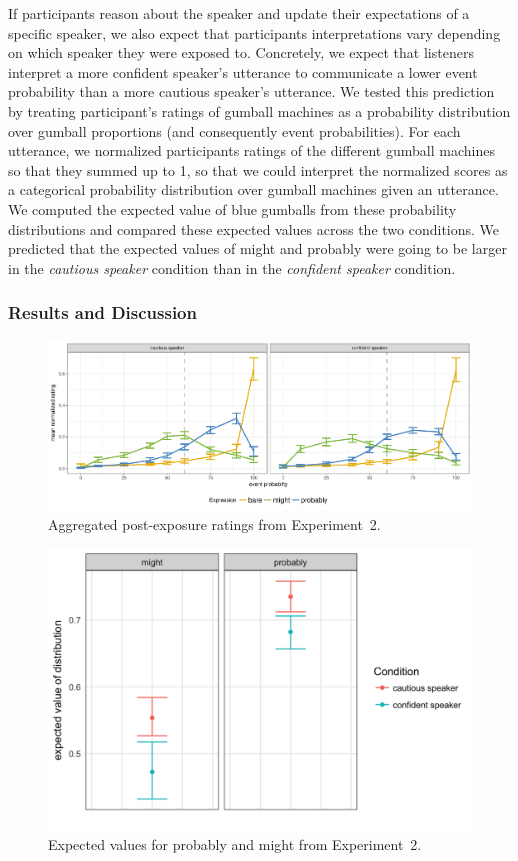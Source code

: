 \documentclass[lucida,biblatex]{sp} %
\begin{document}
If participants reason about the speaker and update their expectations of a specific speaker, we also expect that participants interpretations 
vary depending on which speaker they were exposed to. Concretely, we expect that listeners interpret a more confident speaker's utterance 
to communicate a lower event probability than a more cautious speaker's utterance. We tested this prediction by treating participant's ratings 
of gumball machines as a probability distribution over gumball proportions (and consequently event probabilities).  For each utterance, we 
normalized participants ratings of the different gumball machines so that they summed up to 1, so that we could interpret the normalized scores 
as a categorical probability distribution over gumball machines given an utterance. We computed the expected value of blue gumballs from these probability distributions and compared these expected values across the two conditions. We predicted that the expected values of {\sc might} and {\sc probably} were going to be larger in the \emph{cautious speaker} condition than in the \emph{confident speaker} condition.

\subsubsection{Results and Discussion}

\begin{figure}
\includegraphics[width=\textwidth]{plots/exp-2-ratings.pdf}
\caption{Aggregated post-exposure ratings from Experiment~2.  \label{fig:adaptation-results-comp}}
\end{figure}

\begin{figure}
\includegraphics[width=.75\textwidth]{plots/adaptation-diff-comprehension.png}
\caption{Expected values for {\sc probably} and {\sc might} from Experiment~2.  \label{fig:adaptation-exp-comp}}
\end{figure}
\end{document}
